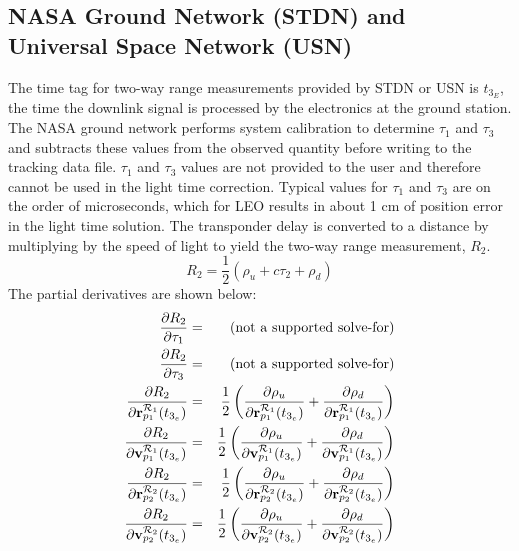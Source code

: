 %

\subsection{NASA Ground Network (STDN) and Universal Space Network (USN) }

The time tag for two-way range measurements provided by STDN or USN is $t_{3_E}$, the time the downlink signal is processed by the electronics at the ground station.  The NASA ground network performs system calibration to determine $\tau_1$ and $\tau_3$ and subtracts these values from the observed quantity before writing to the tracking data file.  $\tau_1$ and $\tau_3$ values are not provided to the user and therefore cannot be used in the light time correction. Typical values for $\tau_1$ and $\tau_3$ are on the order of microseconds, which for LEO results in about 1 cm of position error in the light time solution.  The transponder delay
is converted to a distance by multiplying by the speed of light to yield the two-way range measurement, $R_2$.
%
\begin{equation}
   R_2 =  \frac{1}{2} \left( \rho_{u} + c\tau_2 + \rho_{d}  \right)
\end{equation}
%
The partial derivatives are shown below:
%
\begin{eqnarray}
    \frac{\partial R_2}{\partial  \tau_1} & = & \mbox{(not a supported solve-for)}\\
    \frac{\partial R_2}{\partial  \tau_3} & = & \mbox{(not a supported solve-for)}\\
    \frac{\partial R_2}{\partial \mathbf{r}^{\mcR_1}_{p_1}(t_{3_e})} & = & \frac{1}{2}\left(\frac{\partial \rho_{u}}{\partial \mathbf{r}^{\mcR_1}_{p_1}(t_{3_e})} + \frac{\partial \rho_{d}}{\partial \mathbf{r}^{\mcR_1}_{p_1}(t_{3_e})} \right)\\
    \frac{\partial R_2}{\partial \mathbf{v}^{\mcR_1}_{p_1}(t_{3_e})} & = & \frac{1}{2}\left(\frac{\partial \rho_{u}}{\partial \mathbf{v}^{\mcR_1}_{p_1}(t_{3_e})} + \frac{\partial \rho_{d}}{\partial \mathbf{v}^{\mcR_1}_{p_1}(t_{3_e})}\right)\\
    \frac{\partial R_2}{\partial \mathbf{r}^{\mcR_2}_{p_2}(t_{3_e})} & = & \frac{1}{2}\left(\frac{\partial \rho_{u}}{\partial \mathbf{r}^{\mcR_2}_{p_2}(t_{3_e})} + \frac{\partial \rho_{d}}{\partial \mathbf{r}^{\mcR_2}_{p_2}(t_{3_e})}\right)\\
    \frac{\partial R_2}{\partial \mathbf{v}^{\mcR_2}_{p_2}(t_{3_e})} & = & \frac{1}{2}\left(\frac{\partial \rho_{u}}{\partial \mathbf{v}^{\mcR_2}_{p_2}(t_{3_e})} + \frac{\partial \rho_{d}}{\partial \mathbf{v}^{\mcR_2}_{p_2}(t_{3_e})}\right)\\
\end{eqnarray}

